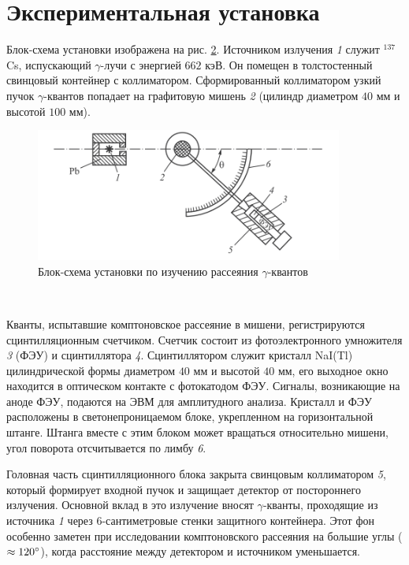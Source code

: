 \documentclass[a4paper,12pt]{article}
\begin{document}
\section{Экспериментальная установка}
Блок-схема установки изображена на рис. \hyperref[fig: Experimental setup]{2}. Источником излучения \textit{1} служит $^{137}$Cs, испускающий $\gamma$-лучи с энергией $662$ кэВ. Он помещен в толстостенный свинцовый контейнер с коллиматором. Сформированный коллиматором узкий пучок $\gamma$-квантов попадает на графитовую мишень \textit{2} (цилиндр диаметром $40$ мм и высотой $100$ мм).
\begin{figure}[H]\label{fig: Experimental setup}
    \centering
    \includegraphics[width = 0.9\textwidth]{Experimental setup.png}
    \caption{Блок-схема установки по изучению рассеяния $\gamma$-квантов}
\end{figure}\

Кванты, испытавшие комптоновское рассеяние в мишени, регистрируются сцинтилляционным счетчиком. Счетчик состоит из фотоэлектронного умножителя \textit{3} (ФЭУ) и сцинтиллятора \textit{4}. Сцинтиллятором служит кристалл NaI(Tl) цилиндрической формы диаметром $40$ мм и высотой $40$ мм, его выходное окно находится в оптическом контакте с фотокатодом ФЭУ. Сигналы, возникающие на аноде ФЭУ, подаются на ЭВМ для
амплитудного анализа. Кристалл и ФЭУ расположены в светонепроницаемом блоке, укрепленном на горизонтальной штанге. Штанга вместе с этим блоком может вращаться относительно мишени, угол поворота отсчитывается по лимбу \textit{6}.

Головная часть сцинтилляционного блока закрыта свинцовым коллиматором \textit{5}, который формирует входной пучок и защищает детектор от постороннего излучения. Основной вклад в это излучение вносят $\gamma$-кванты, проходящие из источника \textit{1} через 6-сантиметровые стенки защитного контейнера. Этот фон особенно заметен при исследовании
комптоновского рассеяния на большие углы ($\approx 120\degree$), когда расстояние между детектором и источником уменьшается.
\end{document}
